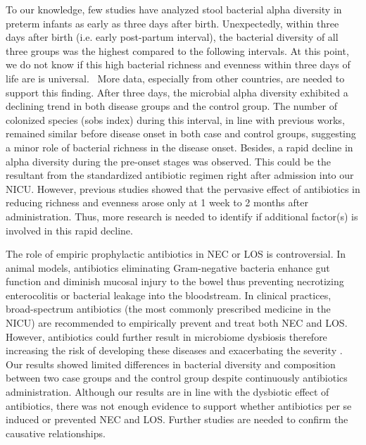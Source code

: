 \documentclass[fleqn,10pt, lineno]{wlpeerj} %
\begin{document}
To our knowledge, few studies have analyzed stool bacterial alpha diversity in preterm infants as early as three days after birth. Unexpectedly, within three days after birth (i.e. early post-partum interval), the bacterial diversity of all three groups was the highest compared to the following intervals. At this point, we do not know if this high bacterial richness and evenness within three days of life are is universal.  More data, especially from other countries, are needed to support this finding. After three days, the microbial alpha diversity exhibited a declining trend in both disease groups and the control group. The number of colonized species (sobs index) during this interval, in line with previous works\citep{mai2011fecal, mai2013distortions}, remained similar before disease onset in both case and control groups, suggesting a minor role of bacterial richness in the disease onset. Besides, a rapid decline in alpha diversity during the pre-onset stages was observed.  This could be the resultant from the standardized antibiotic regimen right after admission into our NICU. However, previous studies showed that the pervasive effect of antibiotics in reducing richness and evenness arose only at 1 week to 2 months after administration\citep{digiulio2008microbial, dethlefsen2011incomplete, fouhy2012high, greenwood2014early, tanaka2009influence}. Thus, more research is needed to identify if additional factor(s) is involved in this rapid decline.

The role of empiric prophylactic antibiotics in NEC or LOS is controversial. In animal models, antibiotics eliminating Gram-negative bacteria enhance gut function and diminish mucosal injury to the bowel thus preventing necrotizing enterocolitis or bacterial leakage into the bloodstream\citep{carlisle2011gram, jensen2013antibiotics, birck2015enteral}. In clinical practices, broad-spectrum antibiotics (the most commonly prescribed medicine in the NICU) are recommended to empirically prevent and treat both NEC and LOS\citep{bury2001enteral, brook2008microbiology, kimberlin2018red}. However, antibiotics could further result in microbiome dysbiosis therefore increasing the risk of developing these diseases and exacerbating the severity \citep{gibson2015antibiotics, kuppala2011prolonged, martinez2017early, cantey2018early}. Our results showed limited differences in bacterial diversity and composition between two case groups and the control group despite continuously antibiotics administration.  Although our results are in line with the dysbiotic effect of antibiotics, there was not enough evidence to support whether antibiotics per se induced or prevented NEC and LOS. Further studies are needed to confirm the causative relationships.
\end{document}
